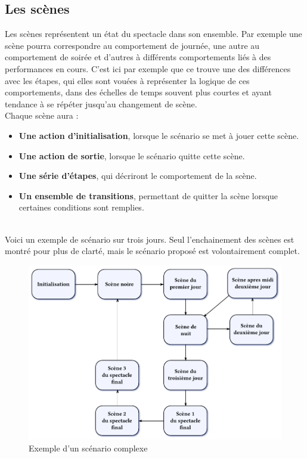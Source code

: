 \subsection{Les scènes}
Les scènes représentent un état du spectacle dans son ensemble. Par exemple une scène pourra correspondre au comportement de journée, une autre au comportement de soirée et d'autres à différents comportements liés à des performances en cours. C'est ici par exemple que ce trouve une des différences avec les étapes, qui elles sont vouées à représenter la logique de ces comportements, dans des échelles de temps souvent plus courtes et ayant tendance à se répéter jusqu'au changement de scène.\\
Chaque scène aura :
\begin{itemize}
\item \textbf{Une action d'initialisation}, lorsque le scénario se met à jouer cette scène.
\item \textbf{Une action de sortie}, lorsque le scénario quitte cette scène.
\item \textbf{Une série d'étapes}, qui décriront le comportement de la scène.
\item \textbf{Un ensemble de transitions}, permettant de quitter la scène lorsque certaines conditions sont remplies.
\end{itemize}~\\
Voici un exemple de scénario sur trois jours. Seul l'enchainement des scènes est montré pour plus de clarté, mais le scénario proposé est volontairement complet.
\begin{figure}[htbp]
  \centering
  \includegraphics[width=\textwidth]{figs/scenario_complet_troisjours.pdf}
  \caption{Exemple d'un scénario complexe}
\end{figure}

